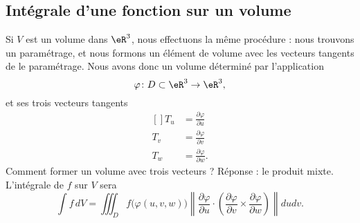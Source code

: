 \subsection{Intégrale d'une fonction sur un volume}

Si \( V\) est un volume dans \( \eR^3\), nous effectuons la même procédure : nous trouvons un paramétrage, et nous formons un élément de volume avec les vecteurs tangents de le paramétrage. Nous avons donc un volume déterminé par l'application
\begin{equation}
	\varphi\colon D\subset\eR^3\to \eR^3,
\end{equation}
et ses trois vecteurs tangents
\begin{equation}
	\begin{aligned}[]
		T_u & =\frac{ \partial \varphi }{ \partial u }  \\
		T_v & =\frac{ \partial \varphi }{ \partial v }  \\
		T_w & =\frac{ \partial \varphi }{ \partial w }.
	\end{aligned}
\end{equation}
Comment former un volume avec trois vecteurs ? Réponse : le produit mixte. L'intégrale de \( f\) sur \( V\) sera
\begin{equation}
	\int f\,dV=\iiint_D f\big( \varphi(u,v,w) \big)\left\| \frac{ \partial \varphi }{ \partial u }\cdot \left( \frac{ \partial \varphi }{ \partial v }\times\frac{ \partial \varphi }{ \partial w }\right) \right\|dudv.
\end{equation}

